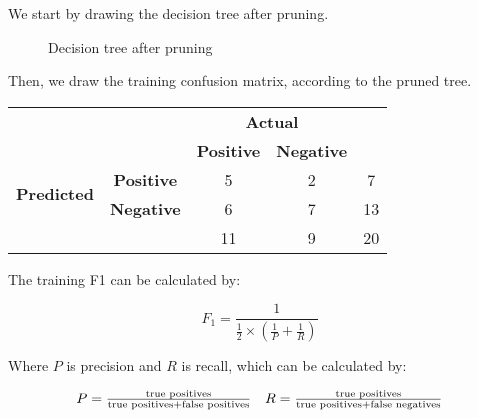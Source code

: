 \documentclass[12pt]{article}
\begin{document}
\begin{enumerate}[leftmargin=\labelsep]
          We start by drawing the decision tree after pruning.

          \begin{figure}[h!]
              \centering
              
              \caption{Decision tree after pruning}
              \label{fig:ex2-tree-pruned}
          \end{figure}

          Then, we draw the training confusion matrix, according to the pruned tree.

          \begin{center}
              \begin{tabular}{|c|c|c|c|c|}
                  \cline{3-4}
                  \multicolumn{2}{c}{}                & \multicolumn{2}{|c|}{\textbf{Actual}} & \multicolumn{1}{c}{}                             \\
                  \cline{3-4}
                  \multicolumn{2}{c|}{}               & \textbf{Positive}                     & \textbf{Negative}    & \multicolumn{1}{c}{}      \\
                  \hline
                  \multirow{2}{*}{\textbf{Predicted}} & \textbf{Positive}                     & 5                    & 2                    & 7  \\
                  \cline{2-5}
                                                      & \textbf{Negative}                     & 6                    & 7                    & 13 \\
                  \hline
                  \multicolumn{2}{c|}{}               & 11                                    & 9                    & 20                        \\
                  \cline{3-5}
              \end{tabular}
          \end{center}

          The training F1 can be calculated by:

          \begin{equation}\label{ex2-f1}
              F_1 = \frac{1}{\frac{1}{2} \times \left(\frac{1}{P} + \frac{1}{R}\right)}
          \end{equation}

          Where \(P\) is precision and \(R\) is recall, which can be calculated by:

          \begin{equation}\label{ex2-precision-recall}
              \begin{array}{l r}
                  P = \frac{\text{true positives}}{\text{true positives} + \text{false positives}}
                   & R = \frac{\text{true positives}}{\text{true positives} + \text{false negatives}}
              \end{array}
          \end{equation}


\end{enumerate}
\end{document}
